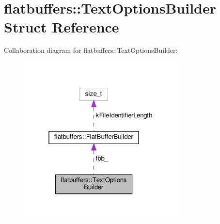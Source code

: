 \hypertarget{structflatbuffers_1_1TextOptionsBuilder}{}\section{flatbuffers\+:\+:Text\+Options\+Builder Struct Reference}
\label{structflatbuffers_1_1TextOptionsBuilder}


Collaboration diagram for flatbuffers\+:\+:Text\+Options\+Builder\+:
\nopagebreak
\begin{figure}[H]
\begin{center}
\leavevmode
\includegraphics[width=241pt]{structflatbuffers_1_1TextOptionsBuilder__coll__graph}
\end{center}
\end{figure}
